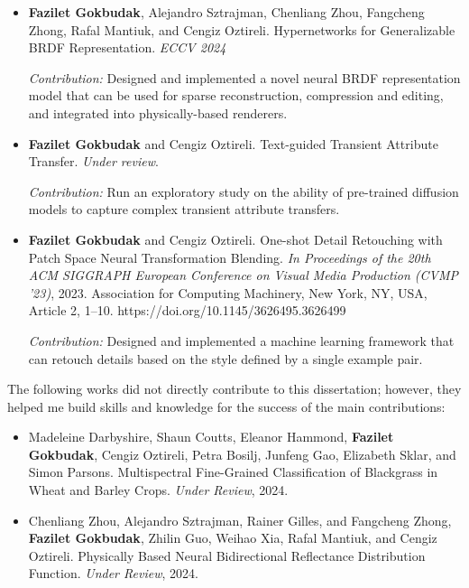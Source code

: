 \begin{itemize}

\item \textbf{Fazilet Gokbudak}, Alejandro Sztrajman, Chenliang Zhou,  Fangcheng Zhong, Rafal Mantiuk, and Cengiz Oztireli. Hypernetworks for Generalizable BRDF Representation. \textit{ECCV 2024}

\textit{Contribution:} Designed and implemented a novel neural BRDF representation model that can be used for sparse reconstruction, compression and editing, and integrated into physically-based renderers.

\item \textbf{Fazilet Gokbudak} and Cengiz Oztireli. Text-guided Transient Attribute Transfer. \textit{Under review}.

\textit{Contribution:} Run an exploratory study on the ability of pre-trained diffusion models to capture complex transient attribute transfers.

\item \textbf{Fazilet Gokbudak} and Cengiz Oztireli. One-shot Detail Retouching with Patch Space Neural Transformation Blending. \textit{In Proceedings of the 20th ACM SIGGRAPH European Conference on Visual Media Production (CVMP '23)}, 2023. Association for Computing Machinery, New York, NY, USA, Article 2, 1–10. https://doi.org/10.1145/3626495.3626499

\textit{Contribution:} Designed and implemented a machine learning framework that can retouch details based on the style defined by a single example pair. 

\end{itemize}

The following works did not directly contribute to this dissertation; however, they helped me build skills and knowledge for the success of the main contributions:

\begin{itemize}

\item Madeleine Darbyshire, Shaun Coutts, Eleanor Hammond, \textbf{Fazilet Gokbudak}, Cengiz Oztireli, Petra Bosilj, Junfeng Gao, Elizabeth Sklar, and Simon Parsons. Multispectral Fine-Grained Classification of Blackgrass in Wheat and Barley Crops. \textit{Under Review}, 2024.

\item Chenliang Zhou, Alejandro Sztrajman, Rainer Gilles, and Fangcheng Zhong, \textbf{Fazilet Gokbudak}, Zhilin Guo, Weihao Xia, Rafal Mantiuk, and Cengiz Oztireli. Physically Based Neural Bidirectional Reflectance Distribution Function. \textit{Under Review}, 2024.

\end{itemize}